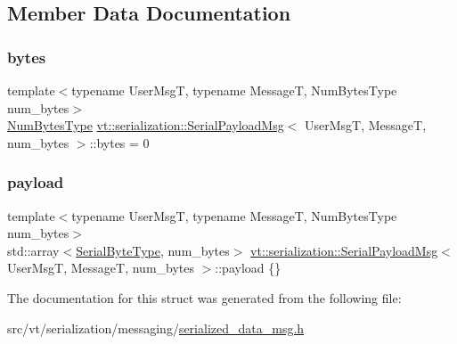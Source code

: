 \subsection{Member Data Documentation}
\mbox{\label{structvt_1_1serialization_1_1_serial_payload_msg_ac9022dd53be215aeca6b300f84834806}} 
\subsubsection{\texorpdfstring{bytes}{bytes}}
{\footnotesize\ttfamily template$<$typename User\+MsgT, typename MessageT, Num\+Bytes\+Type num\+\_\+bytes$>$ \\
\hyperlink{namespacevt_1_1serialization_aaa03b9b407ed5776043c163629312e40}{Num\+Bytes\+Type} \hyperlink{structvt_1_1serialization_1_1_serial_payload_msg}{vt\+::serialization\+::\+Serial\+Payload\+Msg}$<$ User\+MsgT, MessageT, num\+\_\+bytes $>$\+::bytes = 0}

\mbox{\label{structvt_1_1serialization_1_1_serial_payload_msg_ab71d301de848ba00a812bfaf3a0cc44e}} 
\subsubsection{\texorpdfstring{payload}{payload}}
{\footnotesize\ttfamily template$<$typename User\+MsgT, typename MessageT, Num\+Bytes\+Type num\+\_\+bytes$>$ \\
std\+::array$<$\hyperlink{namespacevt_ad48e08beb69a7f184fb1fdb4b7044174}{Serial\+Byte\+Type}, num\+\_\+bytes$>$ \hyperlink{structvt_1_1serialization_1_1_serial_payload_msg}{vt\+::serialization\+::\+Serial\+Payload\+Msg}$<$ User\+MsgT, MessageT, num\+\_\+bytes $>$\+::payload \{\}}



The documentation for this struct was generated from the following file\+:\begin{DoxyCompactItemize}
\item 
src/vt/serialization/messaging/\hyperlink{serialized__data__msg_8h}{serialized\+\_\+data\+\_\+msg.\+h}\end{DoxyCompactItemize}
